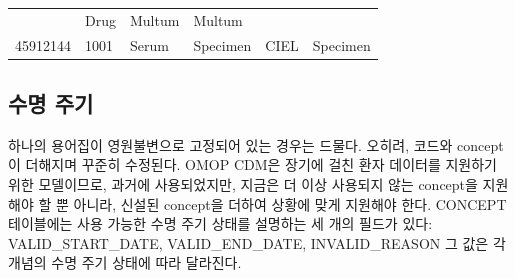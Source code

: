 \documentclass[10.5pt]{book}
\theoremstyle{definition}
\theoremstyle{definition}
\theoremstyle{definition}
\theoremstyle{remark}
\begin{document}
\begin{longtable}[]{@{}llllll@{}}
\begin{minipage}[t]{0.16\columnwidth}
\end{minipage} & \begin{minipage}[t]{0.14\columnwidth}\raggedright\strut
Drug\strut
\end{minipage} & \begin{minipage}[t]{0.14\columnwidth}\raggedright\strut
Multum\strut
\end{minipage} & \begin{minipage}[t]{0.14\columnwidth}\raggedright\strut
Multum\strut
\end{minipage}\tabularnewline
\begin{minipage}[t]{0.13\columnwidth}\raggedright\strut
45912144\strut
\end{minipage} & \begin{minipage}[t]{0.07\columnwidth}\raggedright\strut
1001\strut
\end{minipage} & \begin{minipage}[t]{0.16\columnwidth}\raggedright\strut
Serum\strut
\end{minipage} & \begin{minipage}[t]{0.14\columnwidth}\raggedright\strut
Specimen\strut
\end{minipage} & \begin{minipage}[t]{0.14\columnwidth}\raggedright\strut
CIEL\strut
\end{minipage} & \begin{minipage}[t]{0.14\columnwidth}\raggedright\strut
Specimen\strut
\end{minipage}\tabularnewline
\bottomrule
\end{longtable}

\subsection{수명 주기}\label{conceptLifeCycle}

하나의 용어집이 영원불변으로 고정되어 있는 경우는 드물다. 오히려, 코드와
concept이 더해지며 꾸준히 수정된다. OMOP CDM은 장기에 걸친 환자 데이터를
지원하기 위한 모델이므로, 과거에 사용되었지만, 지금은 더 이상 사용되지
않는 concept을 지원해야 할 뿐 아니라, 신설된 concept을 더하여 상황에
맞게 지원해야 한다. CONCEPT 테이블에는 사용 가능한 수명 주기 상태를
설명하는 세 개의 필드가 있다: VALID\_START\_DATE, VALID\_END\_DATE,
INVALID\_REASON 그 값은 각 개념의 수명 주기 상태에 따라 달라진다.
\end{document}

